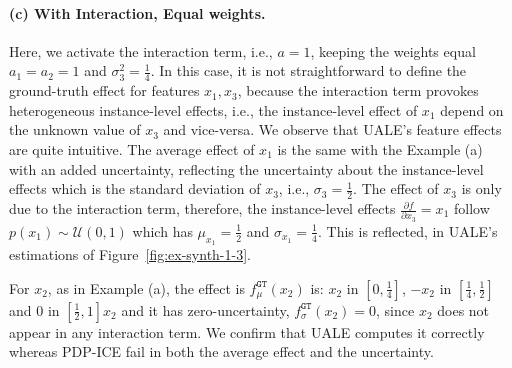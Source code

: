 \documentclass[twoside]{article}
\begin{document}
\paragraph{(c) With Interaction, Equal weights.}

Here, we activate the interaction term, i.e., \(a=1\), keeping the
weights equal \(a_1=a_2=1\) and \(\sigma_3^2=\frac{1}{4}\). In this
case, it is not straightforward to define the ground-truth effect for
features \(x_1, x_3\), because the interaction term provokes
heterogeneous instance-level effects, i.e., the instance-level effect
of \(x_1\) depend on the unknown value of \(x_3\) and vice-versa. We
observe that UALE's feature effects are quite intuitive. The average
effect of \(x_1\) is the same with the Example (a) with an added
uncertainty, reflecting the uncertainty about the instance-level
effects which is the standard deviation of \(x_3\), i.e.,
\(\sigma_3 = \frac{1}{2}\). The effect of \(x_3\) is only due to the
interaction term, therefore, the instance-level effects
\(\frac{\partial f}{\partial x_3} = x_1 \) follow
\(p(x_1) \sim \mathcal{U}(0,1)\) which has \(\mu_{x_1}=\frac{1}{2}\)
and \(\sigma_{x_1}=\frac{1}{4}\). This is reflected, in UALE's
estimations of Figure~\ref{fig:ex-synth-1-3}.

For \(x_2\), as in Example (a), the effect is
\(f_\mu^{\mathtt{GT}}(x_2)\) is: \(x_2\) in \([0, \frac{1}{4}]\),
\(-x_2\) in \([\frac{1}{4}, \frac{1}{2}]\) and \(0\) in
\([\frac{1}{2}, 1]\)\(x_2\) and it has zero-uncertainty,
\(f_\sigma^{\mathtt{GT}}(x_2) = 0\), since \(x_2\) does not appear in
any interaction term. We confirm that UALE computes it correctly
whereas PDP-ICE fail in both the average effect and the uncertainty.
\end{document}

